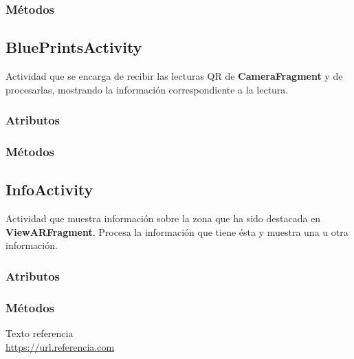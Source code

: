 \documentclass[11pt,a4paper]{article}
\begin{document}
\subsubsection{Métodos}

\subsection{\textbf{BluePrintsActivity}}
\label{sec:blue}

Actividad que se encarga de recibir las lecturas QR de \textbf{CameraFragment} y de procesarlas, mostrando la información
correspondiente a la lectura.

\subsubsection{Atributos}

\subsubsection{Métodos}

\subsection{\textbf{InfoActivity}}
\label{sec:info}

Actividad que muestra información sobre la zona que ha sido destacada en \textbf{ViewARFragment}.
Procesa la información que tiene ésta y muestra una u otra información.

\subsubsection{Atributos}
\subsubsection{Métodos}



\newpage

\begin{thebibliography}{5}

Texto referencia
\\\url{https://url.referencia.com}

\end{thebibliography}
\end{document}
